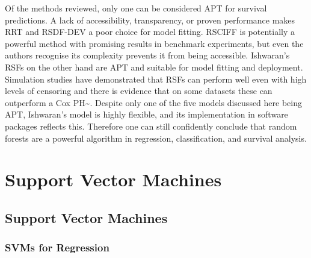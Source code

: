 \documentclass[
  letterpaper,
]{scrbook}
\theoremstyle{plain}
\theoremstyle{definition}
\theoremstyle{remark}
\begin{document}
Of the methods reviewed, only one can be considered APT for survival
predictions. A lack of accessibility, transparency, or proven
performance makes RRT and RSDF-DEV a poor choice for model fitting.
RSCIFF is potentially a powerful method with promising results in
benchmark experiments, but even the authors recognise its complexity
prevents it from being accessible. Ishwaran's RSFs on the other hand are
APT and suitable for model fitting and deployment. Simulation studies
have demonstrated that RSFs can perform well even with high levels of
censoring and there is evidence that on some datasets these can
outperform a Cox PH\textasciitilde{}\cite{Ishwaran2008}. Despite only
one of the five models discussed here being APT, Ishwaran's model is
highly flexible, and its implementation in software packages reflects
this. Therefore one can still confidently conclude that random forests
are a powerful algorithm in regression, classification, and survival
analysis.


\hypertarget{support-vector-machines}{%
\chapter{Support Vector Machines}\label{support-vector-machines}}

\section{Support Vector Machines}
\label{sec:surv_ml_models_svm}

\subsection{SVMs for Regression}
\end{document}
